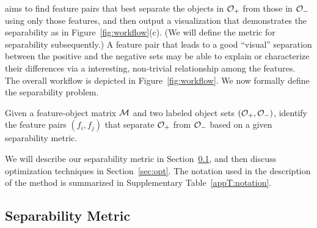 \genviz aims to find feature pairs that
best separate the objects
in ${\mathcal{O}}_+$ from those in ${\mathcal{O}}_-$ using only those features,
and then output a visualization that demonstrates the separability
as in Figure~\ref{fig:workflow}(c).
(We will define the metric for separability subsequently.)
A feature pair that leads to a good ``visual'' separation
between the positive and the negative sets may be able
to explain or characterize their differences via a interesting,
non-trivial relationship among the features.
The overall workflow is depicted in Figure~\ref{fig:workflow}.
We now formally define the separability problem.
\begin{formulation}[Separability]\label{prob:separability}
Given a feature-object matrix ${\mathcal{M}}$ and two labeled object sets $({\mathcal{O}}_+,{\mathcal{O}}_-)$, identify the \topk feature pairs $(f_i,f_j)$ that separate ${\mathcal{O}}_+$ from ${\mathcal{O}}_-$ based on a given separability metric.
\end{formulation}
\noindent %
We will describe our separability metric in Section~\ref{sec:metric}, and then discuss optimization techniques in Section~\ref{sec:opt}. The notation used in the description of the method is summarized in Supplementary Table~\ref{appT:notation}.



\subsection{Separability Metric}\label{sec:metric}

